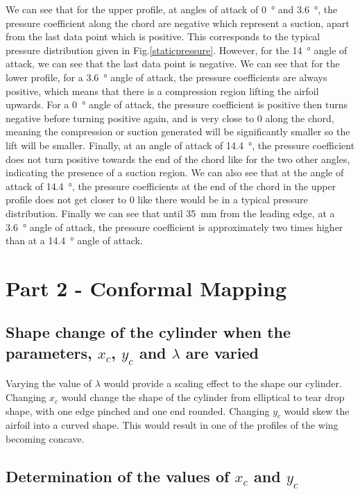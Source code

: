 \documentclass[11pt]{article}
\begin{document}
We can see that for the upper profile, at angles of attack of \SI{0}{\degree} and \SI{3.6}{\degree}, the pressure coefficient along the chord are negative which represent a suction, apart from the last data point which is positive. This corresponds to the typical pressure distribution given in Fig.\ref{staticpressure}. However, for the \SI{14}{\degree} angle of attack, we can see that the last data point is negative. We can see that for the lower profile, for a \SI{3.6}{\degree} angle of attack, the pressure coefficients are always positive, which means that there is a compression region lifting the airfoil upwards. For a \SI{0}{\degree} angle of attack, the pressure coefficient is positive then turns negative before turning positive again, and is very close to 0 along the chord, meaning the compression or suction generated will be significantly smaller so the lift will be smaller. Finally, at an angle of attack of \SI{14.4}{\degree}, the pressure coefficient does not turn positive towards the end of the chord like for the two other angles, indicating the presence of a suction region. We can also see that at the angle of attack of \SI{14.4}{\degree}, the pressure coefficients at the end of the chord in the upper profile does not get closer to 0 like there would be in a typical pressure distribution. Finally we can see that until \SI{35}{\milli\meter} from the leading edge, at a \SI{3.6}{\degree} angle of attack, the pressure coefficient is approximately two times higher than at a \SI{14.4}{\degree} angle of attack.
\section*{Part 2 - Conformal Mapping}
\subsection*{Shape change of the cylinder when the parameters, $x_c$, $y_c$ and $\lambda$ are varied}
Varying the value of $\lambda$ would provide a scaling effect to the shape our cylinder. Changing $x_c$ would change the shape of the cylinder from elliptical to tear drop shape, with one edge pinched and one end rounded. Changing $y_c$ would skew the airfoil into a curved shape. This would result in one of the profiles of the wing becoming concave. 
\subsection*{Determination of the values of $x_c$ and $y_c$ }
\end{document}
